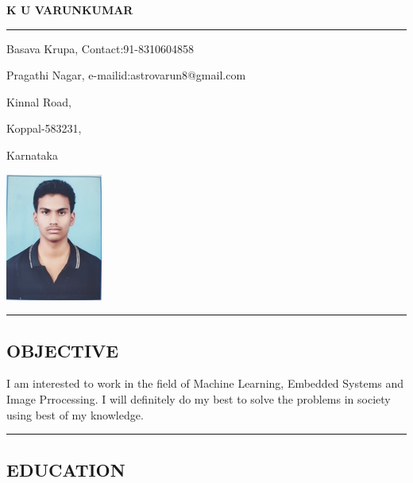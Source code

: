 \documentclass[10pt,letterpaper]{article}
\begin{document}
\begin{center}
\huge 
\textbf {K U VARUNKUMAR}
\end{center}


\hrule
\vspace{1.0em}
\begin{description}
\item Basava Krupa, \hfill Contact:91-8310604858
\item  Pragathi Nagar, \hfill e-mailid:astrovarun8@gmail.com 
 \item Kinnal Road,
\item  Koppal-583231,
\item Karnataka
\end{description}

\hfill \includegraphics{varun}

\vspace{5.0em}


\hrule
\subsection*{OBJECTIVE}
   I am interested to work in the field of  Machine Learning, Embedded Systems and Image Prrocessing. I will definitely do my best to solve the  problems in society using best of my knowledge. 
\vspace{1.0em}

\hrule
\subsection*{EDUCATION}
\end{document}
